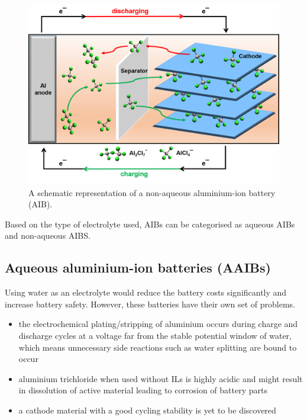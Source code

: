\begin{figure}[tbh!]
\centering
\includegraphics[width=\textwidth]{Figures/chap1fig/AIBmech}
\caption{A schematic representation of a non-aqueous aluminium-ion battery (AIB).}
\label{Figures/chap1fig:AIBmech}
\end{figure}

Based on the type of electrolyte used, AIBs can be categorised as aqueous AIBs and non-aqueous AIBS.  

\subsection{Aqueous aluminium-ion batteries (AAIBs)}
Using water as an electrolyte would reduce the battery costs significantly and increase battery safety. However, these batteries have their own set of problems. 

\begin{itemize}
    \item the electrochemical plating/stripping of aluminium occurs during charge and discharge cycles at a voltage far from the stable potential window of water, which means unnecessary side reactions such as water splitting are bound to occur
    \item aluminium trichloride  when used without ILs is highly acidic and might result in dissolution of active material leading to corrosion of battery parts
    \item a cathode material with a good cycling stability is yet to be discovered
\end{itemize}  

